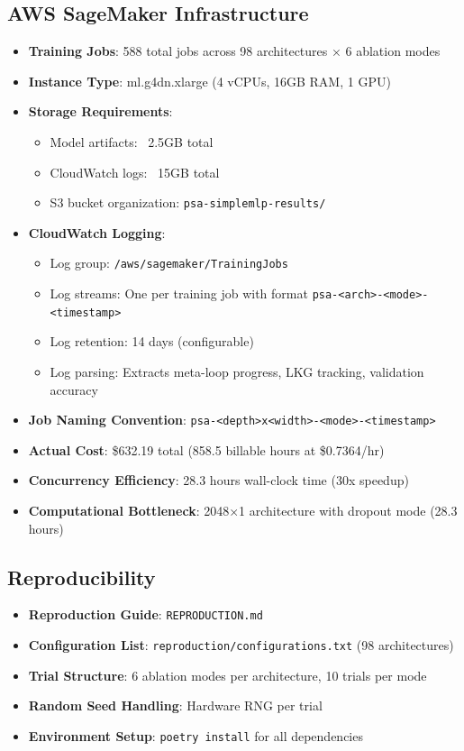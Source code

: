 \documentclass[conference]{IEEEtran}
\begin{document}
\subsection*{AWS SageMaker Infrastructure}

\begin{itemize}
  \item \textbf{Training Jobs}: 588 total jobs across 98 architectures × 6 ablation modes
  \item \textbf{Instance Type}: ml.g4dn.xlarge (4 vCPUs, 16GB RAM, 1 GPU)
  \item \textbf{Storage Requirements}: 
    \begin{itemize}
      \item Model artifacts: ~2.5GB total
      \item CloudWatch logs: ~15GB total
      \item S3 bucket organization: \texttt{psa-simplemlp-results/}
    \end{itemize}
  \item \textbf{CloudWatch Logging}: 
    \begin{itemize}
      \item Log group: \texttt{/aws/sagemaker/TrainingJobs}
      \item Log streams: One per training job with format \texttt{psa-<arch>-<mode>-<timestamp>}
      \item Log retention: 14 days (configurable)
      \item Log parsing: Extracts meta-loop progress, LKG tracking, validation accuracy
    \end{itemize}
  \item \textbf{Job Naming Convention}: \texttt{psa-<depth>x<width>-<mode>-<timestamp>}
  \item \textbf{Actual Cost}: \$632.19 total (858.5 billable hours at \$0.7364/hr)
  \item \textbf{Concurrency Efficiency}: 28.3 hours wall-clock time (30x speedup)
  \item \textbf{Computational Bottleneck}: 2048×1 architecture with dropout mode (28.3 hours)
\end{itemize}

\subsection*{Reproducibility}

\begin{itemize}
  \item \textbf{Reproduction Guide}: \texttt{REPRODUCTION.md}
  \item \textbf{Configuration List}: \texttt{reproduction/configurations.txt} (98 architectures)
  \item \textbf{Trial Structure}: 6 ablation modes per architecture, 10 trials per mode
  \item \textbf{Random Seed Handling}: Hardware RNG per trial
  \item \textbf{Environment Setup}: \texttt{poetry install} for all dependencies
\end{itemize}
\end{document}
